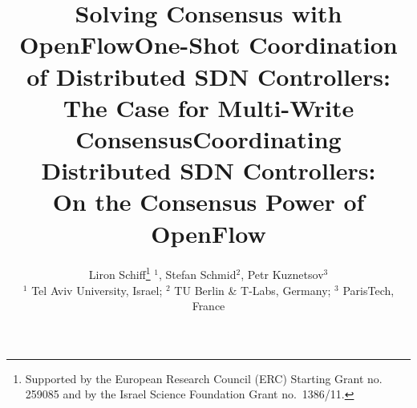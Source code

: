 \documentclass[conference]{sigcomm-alternate}
\begin{document}
\sloppy




\title{Solving Consensus with OpenFlow}

\title{One-Shot Coordination of Distributed SDN Controllers:\\The Case for Multi-Write Consensus}


\title{Coordinating Distributed SDN Controllers:\\On the Consensus Power of OpenFlow}


\author{
Liron Schiff\thanks{Supported by the European Research Council (ERC) Starting Grant no. 259085 and by the Israel Science Foundation Grant no.~1386/11.} $^1$,
Stefan Schmid$^2$, Petr Kuznetsov$^3$ \\
\small $^1$ Tel Aviv University, Israel; $^2$ TU Berlin \& T-Labs, Germany; $^3$ ParisTech, France
}


\date{}


\maketitle


\thispagestyle{empty}


\end{document}
